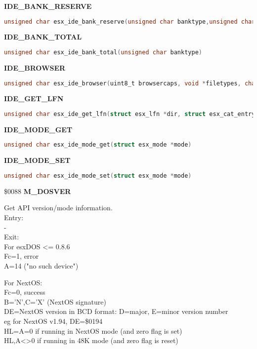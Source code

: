 \textbf{IDE\_BANK\_RESERVE}

\begin{lstlisting}[language=C]
unsigned char esx_ide_bank_reserve(unsigned char banktype,unsigned char page)
\end{lstlisting}

\textbf{IDE\_BANK\_TOTAL}

\begin{lstlisting}[language=C]
unsigned char esx_ide_bank_total(unsigned char banktype)
\end{lstlisting}

\textbf{IDE\_BROWSER}

\begin{lstlisting}[language=C]
unsigned char esx_ide_browser(uint8_t browsercaps, void *filetypes, char *help, char *dst_sfn, char *dst_lfn)
\end{lstlisting}


\textbf{IDE\_GET\_LFN}

\begin{lstlisting}[language=C]
unsigned char esx_ide_get_lfn(struct esx_lfn *dir, struct esx_cat_entry *query)
\end{lstlisting}

\textbf{IDE\_MODE\_GET}

\begin{lstlisting}[language=C]
unsigned char esx_ide_mode_get(struct esx_mode *mode)
\end{lstlisting}

\textbf{IDE\_MODE\_SET}

\begin{lstlisting}[language=C]
unsigned char esx_ide_mode_set(struct esx_mode *mode)
\end{lstlisting}

\$0088 \textbf{M\_DOSVER}

Get API version/mode information.\\
Entry:\\
-\\
Exit:\\
For esxDOS <= 0.8.6\\
Fc=1, error\\
A=14 ("no such device")

For NextOS:\\
Fc=0, success\\
B='N',C='X' (NextOS signature)\\
DE=NextOS version in BCD format: D=major, E=minor version number\\
eg for NextOS v1.94, DE=\$0194\\
HL=A=0 if running in NextOS mode (and zero flag is set)\\
HL,A<>0 if running in 48K mode (and zero flag is reset)

